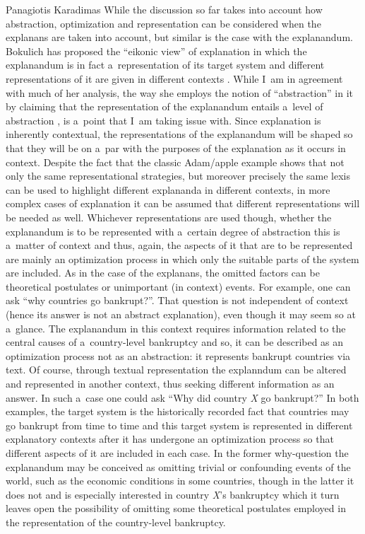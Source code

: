\begin{artengenv}{Panagiotis Karadimas}
While the discussion so far takes into account how abstraction, optimization and representation can be considered when the explanans are taken into account, but similar is the case with the explanandum. Bokulich has proposed the ``eikonic view'' of explanation in which the explanandum is in fact a~representation of its target system and different representations of it are given in different contexts
\parencite[][]{bokulich_representing_2018}. %
 While I~am in agreement with much of her analysis, the way she employs the notion of ``abstraction'' in it by claiming that the representation of the explanandum entails a~level of abstraction 
\parencite[][p.803]{bokulich_representing_2018}, %
 is a~point that I~am taking issue with. Since explanation is inherently contextual, the representations of the explanandum will be shaped so that they will be on a~par with the purposes of the explanation as it occurs in context. Despite the fact that the classic Adam/apple example shows that not only the same representational strategies, but moreover precisely the same lexis can be used to highlight different explananda in different contexts, in more complex cases of explanation it can be assumed that different representations will be needed as well. Whichever representations are used though, whether the explanandum is to be represented with a~certain degree of abstraction this is a~matter of context and thus, again, the aspects of it that are to be represented are mainly an optimization process in which only the suitable parts of the system are included. As in the case of the explanans, the omitted factors can be theoretical postulates or unimportant (in context) events. For example, one can ask ``why countries go bankrupt?''. That question is not independent of context (hence its answer is not an abstract explanation), even though it may seem so at a~glance. The explanandum in this context requires information related to the central causes of a~country-level bankruptcy and so, it can be described as an optimization process not as an abstraction: it represents bankrupt countries via text. Of course, through textual representation the explanndum can be altered and represented in another context, thus seeking different information as an answer. In such a~case one could ask ``Why did country \textit{X} go bankrupt?'' In both examples, the target system is the historically recorded fact that countries may go bankrupt from time to time and this target system is represented in different explanatory contexts after it has undergone an optimization process so that different aspects of it are included in each case. In the former why-question the explanandum may be conceived as omitting trivial or confounding events of the world, such as the economic conditions in some countries, though in the latter it does not and is especially interested in country \textit{X}'s bankruptcy which it turn leaves open the possibility of omitting some theoretical postulates employed in the representation of the country-level bankruptcy.


\end{artengenv}
